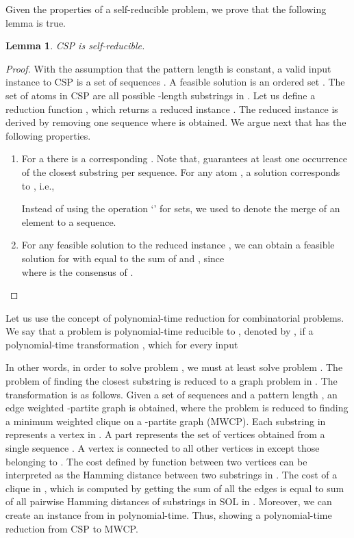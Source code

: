 \documentclass[journal]{acm_proc_article-sp}
\newtheorem{lemma}{Lemma}
\begin{document}
Given the properties of a self-reducible problem, we prove that the following lemma is true. 

\begin{lemma}
CSP is \textit{self-reducible}.
\end{lemma}

\begin{proof}
With the assumption that the pattern length  is constant, a valid input instance  to CSP is a set of  sequences . A feasible solution  is an ordered set  . The set of atoms in CSP are all possible -length substrings in .
Let us define a reduction function , which returns a reduced instance .
The reduced instance is derived by removing one sequence   where  is obtained. We argue next that  has the following properties.

\begin{enumerate}
\item For a  there is a corresponding  . Note that,   guarantees at least one occurrence of the closest substring per sequence. For any atom , a solution  corresponds to , i.e.,
 
Instead of using the operation 
`' for sets, we used  to denote the merge of an element to a sequence.
\item For any feasible solution  to the reduced instance , we can obtain a feasible solution  for  with   equal to the sum of  and , since\\

where  is the consensus of .
\end{enumerate}
\end{proof}

Let us use the concept of polynomial-time reduction for combinatorial problems. We say that a problem  is polynomial-time reducible to , denoted by , if  a polynomial-time transformation , which for every input 

In other words, in order to solve problem , we must at least solve problem . The problem of finding the closest substring is reduced to a graph problem in \cite{Pevzner2000}. The transformation is as follows. Given a set of sequences  and a pattern length , an edge weighted  -partite graph  is obtained, where the problem is reduced to finding  a minimum weighted clique on a -partite graph (MWCP). Each substring in  represents a vertex in . A part  represents the set of vertices obtained from a single sequence . A vertex  is connected to all other vertices in  except those belonging to . The cost defined by function  between two vertices can be interpreted as the Hamming distance between two substrings in . The cost of a clique in , which is computed by getting the sum of all the edges is equal to sum of all pairwise Hamming distances of substrings in SOL in . Moreover, we can create an instance  from  in polynomial-time. Thus, showing a polynomial-time reduction from CSP to MWCP. 
\end{document}
